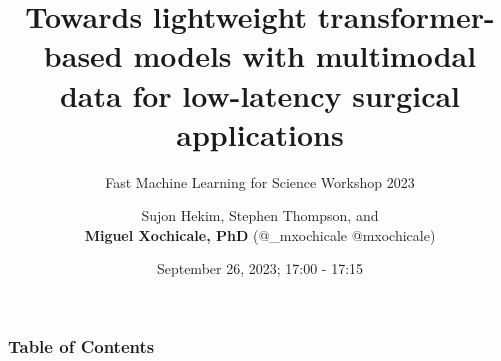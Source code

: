 \documentclass[xcolor={dvipsnames},aspectratio=169,10pt]{beamer}
\title{  
Towards lightweight transformer-based models with multimodal data for low-latency surgical applications
}
\subtitle{Fast Machine Learning for Science Workshop 2023}
\author{
Sujon Hekim, Stephen Thompson, and \\
{\bf Miguel Xochicale, PhD} (\faTwitter @\_mxochicale  \faGithub @mxochicale)
}
\date{
September 26, 2023; 17:00 - 17:15
}
\institute{
	Advanced Research Computing Centre and WEISS \\
	University College London
	}
\begin{document}
\maketitle

\begin{frame}
\frametitle{Table of Contents}
    \tableofcontents
\end{frame}







\end{document}
